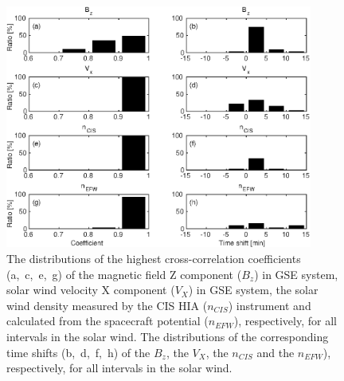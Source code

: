 \documentclass[draft]{agujournal2019}
\begin{document}
\begin{figure}[h]
\centering
\includegraphics[width=0.9\textwidth,angle=0]{swe-2021SW002807-f05} 
\caption{The distributions of the highest cross-correlation coefficients (a,~c,~e,~g) of the magnetic field Z component ($B_z$) in GSE system, solar wind velocity X component ($V_X$) in GSE system, the solar wind density measured by the CIS HIA ($n_{CIS}$) instrument and calculated from the spacecraft potential ($n_{EFW}$), respectively, for all intervals in the solar wind. The distributions of the corresponding time shifts (b,~d,~f,~h) of the $B_z$, the $V_X$, the $n_{CIS}$ and the $n_{EFW}$), respectively, for all intervals in the solar wind.}
\label{fig:swcorrplot}
\end{figure}

\pagebreak
\end{document}

